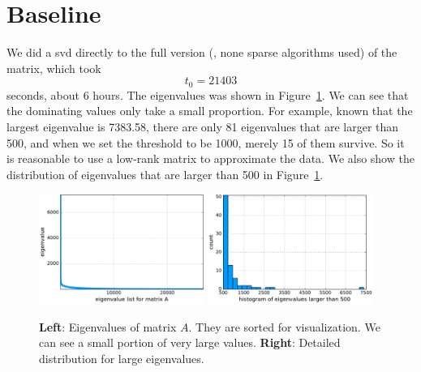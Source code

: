 \section{Baseline}

We did a svd directly to the full version
(\ie, none sparse algorithms used) of the matrix,
which took
\begin{equation}
    t_0=21403
\end{equation}
 seconds, about $6$ hours.
The eigenvalues was shown in Figure~\ref{fig:eig}.
We can see that the dominating values only take a small proportion.
For example,
known that the largest eigenvalue is 7383.58,
there are only 81 eigenvalues that are larger than 500,
and when we set the threshold to be 1000,
merely 15 of them survive.
So it is reasonable to use a low-rank matrix to approximate the data.
We also show the distribution of eigenvalues that are larger than 500
in Figure~\ref{fig:eig}.

\begin{figure}[!ht]
	\centering
	\includegraphics[width=0.48\textwidth]{fig/eigs.pdf}
    \hskip 0.2cm
	\includegraphics[width=0.48\textwidth]{fig/eig_large.pdf}
	\caption{\small
  		\textbf{Left}: Eigenvalues of matrix $A$.
          They are sorted for visualization.
          We can see a small portion of very large values.
        \textbf{Right}: Detailed distribution for large eigenvalues.}
	\label{fig:eig}
\end{figure}

